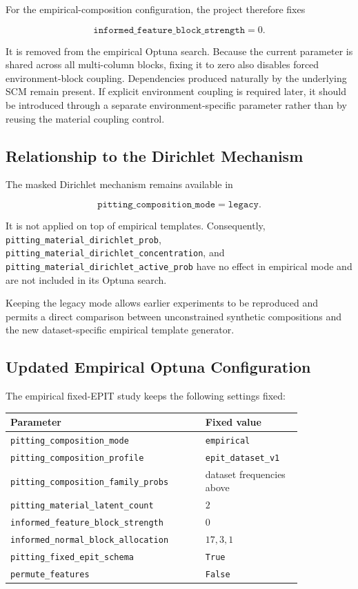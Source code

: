 \documentclass{article}
\begin{document}
For the empirical-composition configuration, the project therefore fixes

\[
\texttt{informed\_feature\_block\_strength}
=
0.
\]

It is removed from the empirical Optuna search. Because the current parameter is
shared across all multi-column blocks, fixing it to zero also disables forced
environment-block coupling. Dependencies produced naturally by the underlying
SCM remain present. If explicit environment coupling is required later, it
should be introduced through a separate environment-specific parameter rather
than by reusing the material coupling control.

\subsection{Relationship to the Dirichlet Mechanism}

The masked Dirichlet mechanism remains available in

\[
\texttt{pitting\_composition\_mode}
=
\texttt{legacy}.
\]

It is not applied on top of empirical templates. Consequently,
\texttt{pitting\_material\_dirichlet\_prob},
\texttt{pitting\_material\_dirichlet\_concentration}, and
\texttt{pitting\_material\_dirichlet\_active\_prob} have no effect in empirical
mode and are not included in its Optuna search.

Keeping the legacy mode allows earlier experiments to be reproduced and permits
a direct comparison between unconstrained synthetic compositions and the new
dataset-specific empirical template generator.

\subsection{Updated Empirical Optuna Configuration}

The empirical fixed-EPIT study keeps the following settings fixed:

\begin{center}
\small
\begin{tabular}{p{0.57\linewidth}p{0.27\linewidth}}
\hline
\textbf{Parameter} & \textbf{Fixed value} \\
\hline
\texttt{pitting\_composition\_mode} & \texttt{empirical} \\
\texttt{pitting\_composition\_profile} & \texttt{epit\_dataset\_v1} \\
\texttt{pitting\_composition\_family\_probs} & dataset frequencies above \\
\texttt{pitting\_material\_latent\_count} & \(2\) \\
\texttt{informed\_feature\_block\_strength} & \(0\) \\
\texttt{informed\_normal\_block\_allocation} & \(17,3,1\) \\
\texttt{pitting\_fixed\_epit\_schema} & \texttt{True} \\
\texttt{permute\_features} & \texttt{False} \\
\hline
\end{tabular}
\end{center}
\end{document}
